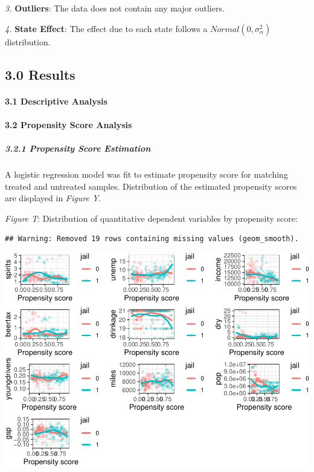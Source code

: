 \documentclass[]{article}
\let\oldparagraph\paragraph
\renewcommand{\paragraph}[1]{\oldparagraph{#1}\mbox{}}
\let\oldsubparagraph\subparagraph
\renewcommand{\subparagraph}[1]{\oldsubparagraph{#1}\mbox{}}
\begin{document}
\emph{3.} \textbf{Outliers}: The data does not contain any major
outliers.

\emph{4.} \textbf{State Effect}: The effect due to each state follows a
\(Normal(0,\sigma_{\alpha}^2)\) distribution.

\hypertarget{results}{%
\subsection{3.0 Results}\label{results}}

\hypertarget{descriptive-analysis-1}{%
\paragraph{3.1 Descriptive Analysis}\label{descriptive-analysis-1}}

\hypertarget{propensity-score-analysis-1}{%
\paragraph{3.2 Propensity Score
Analysis}\label{propensity-score-analysis-1}}

\hypertarget{propensity-score-estimation-1}{%
\subparagraph{3.2.1 Propensity Score
Estimation}\label{propensity-score-estimation-1}}

A logistic regression model was fit to estimate propensity score for
matching treated and untreated samples. Distribution of the estimated
propensity scores are displayed in \emph{Figure Y}.

\emph{Figure T}: Distribution of quantitative dependent variables by
propensity score:

\begin{verbatim}
## Warning: Removed 19 rows containing missing values (geom_smooth).
\end{verbatim}

\includegraphics{Project3_Rongkui_files/figure-latex/unnamed-chunk-14-1.pdf}
\end{document}
